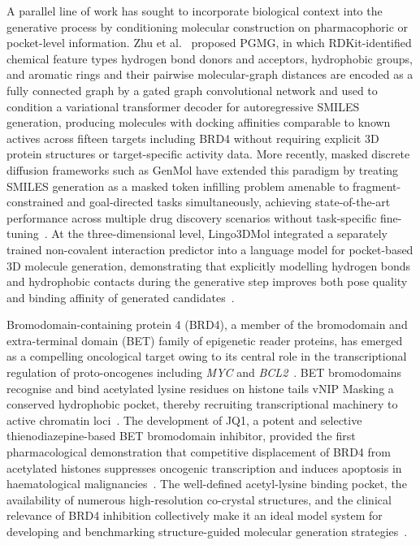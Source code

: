 \documentclass[a4paper,12pt]{article}
\begin{document}
A parallel line of work has sought to incorporate biological context into the generative 
process by conditioning molecular construction on pharmacophoric or pocket-level 
information. Zhu et al.~\cite{zhu2023pgmg} proposed PGMG, in which RDKit-identified 
chemical feature types hydrogen bond donors and acceptors, hydrophobic groups, and 
aromatic rings and their pairwise molecular-graph distances are encoded as a fully 
connected graph by a gated graph convolutional network and used to condition a 
variational transformer decoder for autoregressive SMILES generation, producing 
molecules with docking affinities comparable to known actives across fifteen targets 
including BRD4 without requiring explicit 3D protein structures or target-specific 
activity data. More recently, masked discrete 
diffusion frameworks such as GenMol have extended this paradigm by treating SMILES 
generation as a masked token infilling problem amenable to fragment-constrained and 
goal-directed tasks simultaneously, achieving state-of-the-art performance across 
multiple drug discovery scenarios without task-specific fine-tuning~\cite{lee2025genmol}. 
At the three-dimensional level, Lingo3DMol integrated a separately trained non-covalent 
interaction predictor into a language model for pocket-based 3D molecule generation, 
demonstrating that explicitly modelling hydrogen bonds and hydrophobic contacts during 
the generative step improves both pose quality and binding affinity of generated 
candidates~\cite{feng2024lingo3dmol}.



Bromodomain-containing protein 4 (BRD4), a member of the bromodomain and
extra-terminal domain (BET) family of epigenetic reader proteins, has emerged
as a compelling oncological target owing to its central role in the
transcriptional regulation of proto-oncogenes including \textit{MYC} and
\textit{BCL2}~\cite{filippakopoulos2010selective, ShiVakoc2014}.
BET bromodomains recognise and bind acetylated lysine residues on histone
tails vNIP Masking a conserved hydrophobic pocket, thereby recruiting transcriptional
machinery to active chromatin loci~\cite{filippakopoulos2010selective}.
The development of JQ1, a potent and selective thienodiazepine-based BET
bromodomain inhibitor, provided the first pharmacological demonstration that
competitive displacement of BRD4 from acetylated histones suppresses
oncogenic transcription and induces apoptosis in haematological
malignancies~\cite{filippakopoulos2010selective, Delmore2011}.
The well-defined acetyl-lysine binding pocket, the availability of numerous
high-resolution co-crystal structures, and the clinical relevance of BRD4
inhibition collectively make it an ideal model system for developing and
benchmarking structure-guided molecular generation
strategies~\cite{ShiVakoc2014}.
\end{document}
